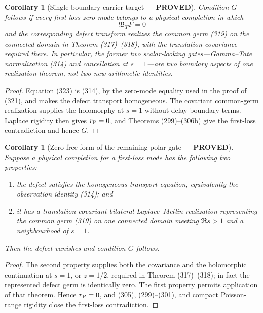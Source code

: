 \documentclass[11pt]{article}
\newtheorem{corollary}[theorem]{Corollary}
\newcommand{\PROVED}{\textcolor{green!45!black}{\textbf{PROVED}}}
\begin{document}
\begin{corollary}[Single boundary-carrier target --- \PROVED]
Condition $G$ follows if every first-loss zero mode belongs to a physical
completion in which
\begin{equation}
 \boxed{\mathfrak B_TF=0}                              \tag{323}
\end{equation}
and the corresponding defect transform realizes the common germ (319) on
the connected domain in Theorem (317)--(318), with the
translation-covariance required there.  In particular, the former
two scalar-looking gates---Gamma--Tate normalization (314) and cancellation
at $s=1$---are two boundary aspects of one realization theorem, not two new
arithmetic identities.
\end{corollary}

\begin{proof}
Equation (323) is (314), by the zero-mode equality used in the proof of
(321), and makes the defect transport homogeneous.  The covariant
common-germ realization supplies the holomorphy at $s=1$ without delay
boundary terms.  Laplace rigidity then gives $r_{\rm P}=0$, and Theorems
(299)--(306b) give the first-loss contradiction and hence $G$.
\end{proof}

\begin{corollary}[Zero-free form of the remaining polar gate --- \PROVED]
Suppose a physical completion for a first-loss mode has the following two
properties:
\begin{enumerate}
\item the defect satisfies the homogeneous transport equation, equivalently
      the observation identity (314); and
\item it has a translation-covariant bilateral Laplace--Mellin realization
      representing the common germ (319) on one connected domain meeting
      $\Re s>1$ and a neighbourhood of $s=1$.
\end{enumerate}
Then the defect vanishes and condition $G$ follows.
\end{corollary}

\begin{proof}
The second property supplies both the covariance and the holomorphic
continuation at $s=1$, or $z=1/2$, required in Theorem (317)--(318); in fact
the represented defect germ is identically zero.  The first property permits
application of that theorem.  Hence $r_{\rm P}=0$, and (305),
(299)--(301), and compact Poisson-range rigidity close the first-loss
contradiction.
\end{proof}
\end{document}
